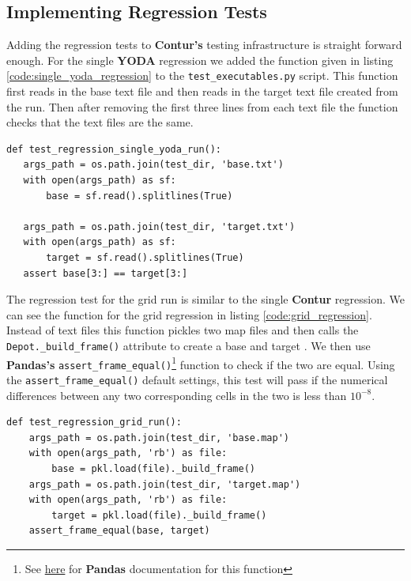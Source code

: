 \subsection{Implementing Regression Tests}
Adding the regression tests to \textbf{Contur's} testing infrastructure is straight forward enough. For the single \textbf{YODA} regression we added the function given in listing \ref{code:single_yoda_regression} to the \texttt{test\_executables.py} script. This function first reads in the base text file and then reads in the target text file created from the run. Then after removing the first three lines from each text file the function checks that the text files are the same.
\begin{code}
\label{code:single_yoda_regression}
\begin{verbatim}
def test_regression_single_yoda_run():
   args_path = os.path.join(test_dir, 'base.txt')
   with open(args_path) as sf:
       base = sf.read().splitlines(True)
    
   args_path = os.path.join(test_dir, 'target.txt')
   with open(args_path) as sf:
       target = sf.read().splitlines(True)
   assert base[3:] == target[3:]
\end{verbatim}
\end{code}

The regression test for the grid run is similar to the single \textbf{Contur} regression. We can see the function for the grid regression in listing \ref{code:grid_regression}. Instead of text files this function pickles two map files and then calls the \texttt{Depot.\_build\_frame()} attribute to create a base and target . We then use \textbf{Pandas's} \texttt{assert\_frame\_equal()}\footnote{See \href{https://pandas.pydata.org/docs/reference/api/pandas.testing.assert_frame_equal.html}{here} for \textbf{Pandas} documentation for this function} function to check if the two  are equal. Using the \texttt{assert\_frame\_equal()} default settings, this test will pass if the numerical differences between any two corresponding cells in the two  is less than $10^{-8}$.

\begin{code}
\label{code:grid_regression}
\begin{verbatim}
def test_regression_grid_run():
    args_path = os.path.join(test_dir, 'base.map')
    with open(args_path, 'rb') as file:
        base = pkl.load(file)._build_frame()
    args_path = os.path.join(test_dir, 'target.map')
    with open(args_path, 'rb') as file:
        target = pkl.load(file)._build_frame()
    assert_frame_equal(base, target)
\end{verbatim}
\end{code}

